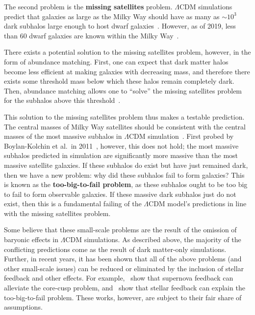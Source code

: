 The second problem is the \textbf{missing satellites} problem.  $\Lambda$CDM
simulations predict that galaxies as large as the Milky Way should have as
many as \(\sim 10^3\) dark subhalos large enough to host dwarf
galaxies~\cite{bullock_small-scale_2017}.  However, as of 2019, less than 60
dwarf galaxies are known within the Milky Way~\cite{simon_faintest_2019}.

There exists a potential solution to the missing satellites problem,
however, in the form of abundance matching. First, one can expect that
dark matter halos become less efficient at making galaxies with
decreasing mass, and therefore there exists some threshold mass below
which these halos remain completely dark. Then, abundance matching
allows one to ``solve'' the missing satellites problem for the subhalos
above this threshold~\cite{bullock_small-scale_2017}.

This solution to the missing satellites problem thus makes a testable
prediction. The central masses of Milky Way satellites should be
consistent with the central masses of the most massive subhalos in
\(\Lambda\)CDM simulation~\cite{bullock_small-scale_2017}. First
probed by Boylan-Kolchin et al.~in 2011~\cite{boylan-kolchin_too_2011},
however, this does not hold; the most massive subhalos predicted in simulation
are significantly more massive than the most massive satellite galaxies.  If
these subhalos do exist but have just remained dark, then we have a new
problem: why did these subhalos fail to form galaxies?  This is known as the
\textbf{too-big-to-fail problem}, as these subhalos ought to be too big to
fail to form observable galaxies.  If these massive dark subhalos just do not
exist, then this is a fundamental failing of the \(\Lambda\)CDM model's
predictions in line with the missing satellites problem.

Some believe that these small-scale problems are the result of the omission of
baryonic effects in \(\Lambda\)CDM simulations. As described above, the
majority of the conflicting predictions come as the result of dark matter-only
simulations. Further, in recent years, it has been shown that all of the above
problems (and other small-scale issues) can be reduced or eliminated by the
inclusion of stellar feedback and other effects. For example,~\cite{pontzen_how_2012} show that supernova feedback can alleviate the core-cusp
problem, and~\cite{chan_impact_2015} show that stellar feedback can explain
the too-big-to-fail problem. These works, however, are subject to their fair
share of assumptions.

